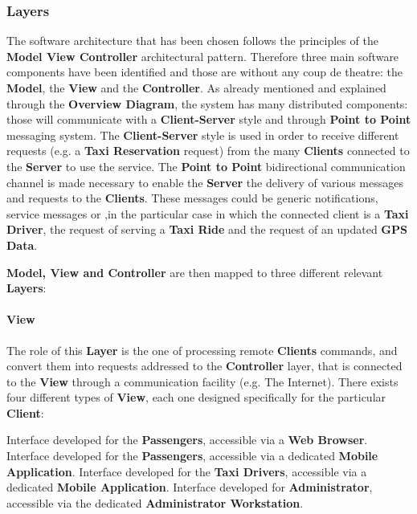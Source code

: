 \subsubsection{Layers}
The software architecture that has been chosen follows the principles of the \textbf{Model View Controller} architectural pattern.
Therefore three main software components have been identified and those are without any coup de theatre: the \textbf{Model}, the \textbf{View} and the \textbf{Controller}.
As already mentioned and explained through the \textbf{Overview Diagram}, the system has many distributed components: those will communicate with a \textbf{Client-Server} style and through \textbf{Point to Point} messaging system.
The \textbf{Client-Server} style is used in order to receive different requests (e.g. a \textbf{Taxi Reservation} request) from the many \textbf{Clients} connected to the \textbf{Server} to use the service.
The \textbf{Point to Point} bidirectional communication channel is made necessary to enable the \textbf{Server} the delivery of various messages and requests to the \textbf{Clients}.
These messages could be generic notifications, service messages or ,in the particular case in which the connected client is a \textbf{Taxi Driver}, the request of serving a \textbf{Taxi Ride} and the request of an updated \textbf{GPS Data}.

\textbf{Model, View and Controller} are then mapped to three different relevant \textbf{Layers}:

\paragraph{View}
The role of this \textbf{Layer} is the one of processing remote \textbf{Clients} commands, and convert them into requests addressed to the \textbf{Controller} layer, that is connected to the \textbf{View} through a communication facility (e.g. The Internet).
There exists four different types of \textbf{View}, each one designed specifically for the particular \textbf{Client}:
\begin{itemize}
	 Interface developed for the \textbf{Passengers}, accessible via a \textbf{Web Browser}.
	 Interface developed for the \textbf{Passengers}, accessible via a dedicated \textbf{Mobile Application}.
	 Interface developed for the \textbf{Taxi Drivers}, accessible via a dedicated \textbf{Mobile Application}.
	 Interface developed for \myTaxiService{} \textbf{Administrator}, accessible via the dedicated \textbf{Administrator Workstation}.
\end{itemize}

